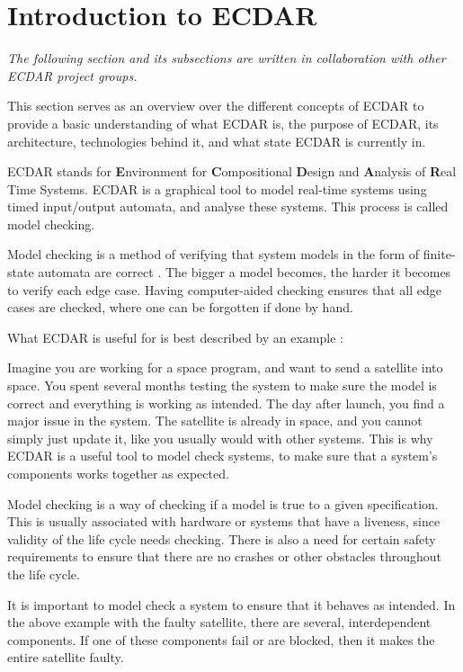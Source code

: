 \section{Introduction to ECDAR}\label{sec:introduction-to-ecdar}
\textit{The following section and its subsections are written in collaboration with other ECDAR project groups.}\vspace{1em}

This section serves as an overview over the different concepts of ECDAR to provide a basic understanding of what ECDAR is, the purpose of ECDAR, its architecture, technologies behind it, and what state ECDAR is currently in.

ECDAR stands for \textbf{E}nvironment for \textbf{C}ompositional \textbf{D}esign and \textbf{A}nalysis of \textbf{R}eal Time Systems.
ECDAR is a graphical tool to model real-time systems using timed input/output automata, and analyse these systems. 
This process is called model checking. 

Model checking is a method of verifying that system models in the form of finite-state automata are correct \cite{modelchecking-handbook}. 
The bigger a model becomes, the harder it becomes to verify each edge case. 
Having computer-aided checking ensures that all edge cases are checked, where one can be forgotten if done by hand.

What ECDAR is useful for is best described by an example \label{ECDAR:satellite}:

Imagine you are working for a space program, and want to send a satellite into space.
You spent several months testing the system to make sure the model is correct and everything is working as intended.
The day after launch, you find a major issue in the system.
The satellite is already in space, and you cannot simply just update it, like you usually would with other systems. 
This is why ECDAR is a useful tool to model check systems, to make sure that a system's components works together as expected.

Model checking is a way of checking if a model is true to a given specification.
This is usually associated with hardware or systems that have a liveness, since validity of the life cycle needs checking.
There is also a need for certain safety requirements to ensure that there are no crashes or other obstacles throughout the life cycle.

It is important to model check a system to ensure that it behaves as intended.
In the above example with the faulty satellite, there are several, interdependent components.
If one of these components fail or are blocked, then it makes the entire satellite faulty.

